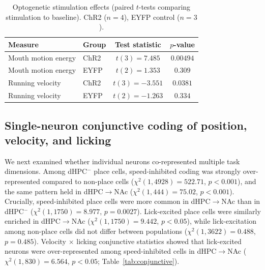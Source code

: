 \documentclass[11pt]{article}
\begin{document}
\begin{table}[H]
\centering
\caption{Optogenetic stimulation effects (paired $t$-tests comparing stimulation to baseline). ChR2 ($n=4$), EYFP control ($n=3$).}
\label{tab:opto}
\begin{tabular}{llcc}
\toprule
Measure & Group & Test statistic & $p$-value \\
\midrule
Mouth motion energy & ChR2 & $t(3) = 7.485$ & $0.00494$ \\
Mouth motion energy & EYFP & $t(2) = 1.353$ & $0.309$ \\
Running velocity & ChR2 & $t(3) = -3.551$ & $0.0381$ \\
Running velocity & EYFP & $t(2) = -1.263$ & $0.334$ \\
\bottomrule
\end{tabular}
\end{table}

\subsection{Single-neuron conjunctive coding of position, velocity, and licking}

We next examined whether individual neurons co-represented multiple task dimensions. Among dHPC$^-$ place cells, speed-inhibited coding was strongly over-represented compared to non-place cells ($\chi^2(1,4928) = 522.71$, $p<0.001$), and the same pattern held in dHPC$\to$NAc ($\chi^2(1,444) = 75.02$, $p<0.001$). Crucially, speed-inhibited place cells were more common in dHPC$\to$NAc than in dHPC$^-$ ($\chi^2(1,1750) = 8.977$, $p=0.0027$). Lick-excited place cells were similarly enriched in dHPC$\to$NAc ($\chi^2(1,1750) = 9.442$, $p<0.05$), while lick-excitation among non-place cells did not differ between populations ($\chi^2(1,3622) = 0.488$, $p=0.485$). Velocity $\times$ licking conjunctive statistics showed that lick-excited neurons were over-represented among speed-inhibited cells in dHPC$\to$NAc ($\chi^2(1,830) = 6.564$, $p<0.05$; Table~\ref{tab:conjunctive}).
\end{document}
